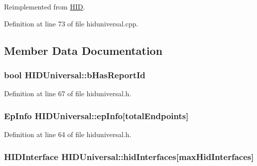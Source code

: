 \-Reimplemented from \hyperlink{class_h_i_d_ae3b964d20c828fb27076f50d220fe275}{\-H\-I\-D}.



\-Definition at line 73 of file hiduniversal.\-cpp.



\subsection{\-Member \-Data \-Documentation}
\hypertarget{class_h_i_d_universal_a1c333e67c1bd0e69db565d6976d063b1}{
\subsubsection[{b\-Has\-Report\-Id}]{\setlength{\rightskip}{0pt plus 5cm}bool {\bf \-H\-I\-D\-Universal\-::b\-Has\-Report\-Id}}}\label{class_h_i_d_universal_a1c333e67c1bd0e69db565d6976d063b1}


\-Definition at line 67 of file hiduniversal.\-h.

\hypertarget{class_h_i_d_universal_ad26d2e63130abac2059154bf5afbf152}{
\subsubsection[{ep\-Info}]{\setlength{\rightskip}{0pt plus 5cm}\-Ep\-Info {\bf \-H\-I\-D\-Universal\-::ep\-Info}\mbox{[}{\bf total\-Endpoints}\mbox{]}}}\label{class_h_i_d_universal_ad26d2e63130abac2059154bf5afbf152}


\-Definition at line 64 of file hiduniversal.\-h.

\hypertarget{class_h_i_d_universal_a542ee234ff63c01eb3dff607fb3b0def}{
\subsubsection[{hid\-Interfaces}]{\setlength{\rightskip}{0pt plus 5cm}\-H\-I\-D\-Interface {\bf \-H\-I\-D\-Universal\-::hid\-Interfaces}\mbox{[}{\bf max\-Hid\-Interfaces}\mbox{]}}}\label{class_h_i_d_universal_a542ee234ff63c01eb3dff607fb3b0def}


